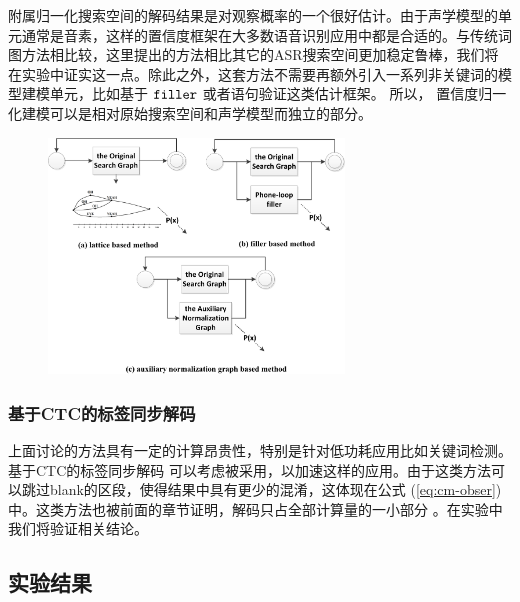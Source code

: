  附属归一化搜索空间的解码结果是对观察概率的一个很好估计。由于声学模型的单元通常是音素，这样的置信度框架在大多数语音识别应用中都是合适的。与传统词图方法相比较，这里提出的方法相比其它的ASR搜索空间更加稳定鲁棒，我们将在实验中证实这一点。除此之外，这套方法不需要再额外引入一系列非关键词的模型建模单元，比如基于 $\tt filler$ 或者语句验证这类估计框架。
 所以， 置信度归一化建模可以是相对原始搜索空间和声学模型而独立的部分。


\begin{figure}[htb]
  \centering
    \captionstyle{\centering}
    \includegraphics[width=0.7\textwidth]{figure/graph_example.png}
\end{figure}

 \subsubsection{基于CTC的标签同步解码}
 \label{Sec:psd-ctc}

上面讨论的方法具有一定的计算昂贵性，特别是针对低功耗应用比如关键词检测。基于CTC的标签同步解码 \cite{Chen+2016} 可以考虑被采用，以加速这样的应用。由于这类方法可以跳过blank的区段，使得结果中具有更少的混淆，这体现在公式 (\ref{eq:cm-obser})中。这类方法也被前面的章节证明，解码只占全部计算量的一小部分 \cite{Chen+2016}\cite{zhc00-chen-tasl2017} 。在实验中我们将验证相关结论。

\subsection{实验结果}
\label{chap:unify-exp}


